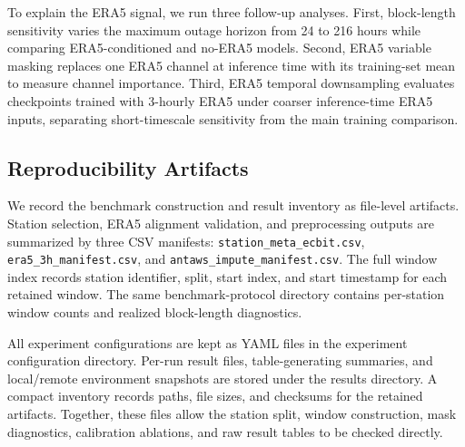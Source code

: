 To explain the ERA5 signal, we run three follow-up analyses. First, block-length sensitivity varies the maximum outage horizon from 24 to 216 hours while comparing ERA5-conditioned and no-ERA5 models. Second, ERA5 variable masking replaces one ERA5 channel at inference time with its training-set mean to measure channel importance. Third, ERA5 temporal downsampling evaluates checkpoints trained with 3-hourly ERA5 under coarser inference-time ERA5 inputs, separating short-timescale sensitivity from the main training comparison.

\subsection{Reproducibility Artifacts}
We record the benchmark construction and result inventory as file-level artifacts. Station selection, ERA5 alignment validation, and preprocessing outputs are summarized by three CSV manifests: \texttt{station\_meta\_ecbit.csv}, \texttt{era5\_3h\_manifest.csv}, and \texttt{antaws\_impute\_manifest.csv}. The full window index records station identifier, split, start index, and start timestamp for each retained window. The same benchmark-protocol directory contains per-station window counts and realized block-length diagnostics.

All experiment configurations are kept as YAML files in the experiment configuration directory. Per-run result files, table-generating summaries, and local/remote environment snapshots are stored under the results directory. A compact inventory records paths, file sizes, and checksums for the retained artifacts. Together, these files allow the station split, window construction, mask diagnostics, calibration ablations, and raw result tables to be checked directly.
